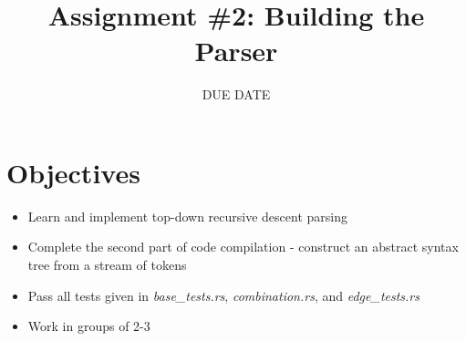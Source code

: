 \documentclass[
	12pt, %
]{fphw}
\title{Assignment \#2: Building the Parser} %
\date{DUE DATE} %
\institute{Union College} %
\begin{document}
\maketitle %


\section*{Objectives}

\begin{problem}
	\begin{itemize}
	    \item Learn and implement top-down recursive descent parsing
        \item Complete the second part of code compilation - construct an abstract syntax tree from a stream of tokens
        \item Pass all tests given in \textit{base\_tests.rs}, \textit{combination.rs}, and \textit{edge\_tests.rs}
        \item Work in groups of 2-3
        
	\end{itemize}
\end{problem}

\end{document}
